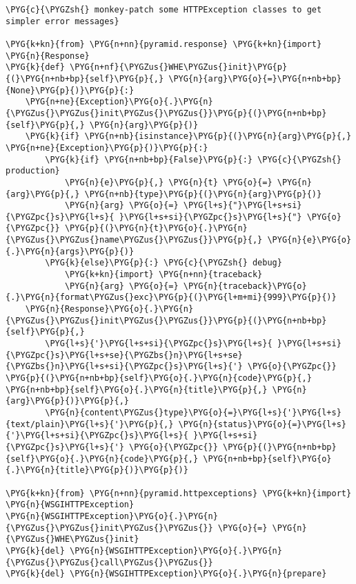 \begin{Verbatim}[commandchars=\\\{\}]
\PYG{c}{\PYGZsh{} monkey-patch some HTTPException classes to get simpler error messages}

\PYG{k+kn}{from} \PYG{n+nn}{pyramid.response} \PYG{k+kn}{import} \PYG{n}{Response}
\PYG{k}{def} \PYG{n+nf}{\PYGZus{}WHE\PYGZus{}init}\PYG{p}{(}\PYG{n+nb+bp}{self}\PYG{p}{,} \PYG{n}{arg}\PYG{o}{=}\PYG{n+nb+bp}{None}\PYG{p}{)}\PYG{p}{:}
    \PYG{n+ne}{Exception}\PYG{o}{.}\PYG{n}{\PYGZus{}\PYGZus{}init\PYGZus{}\PYGZus{}}\PYG{p}{(}\PYG{n+nb+bp}{self}\PYG{p}{,} \PYG{n}{arg}\PYG{p}{)}
    \PYG{k}{if} \PYG{n+nb}{isinstance}\PYG{p}{(}\PYG{n}{arg}\PYG{p}{,} \PYG{n+ne}{Exception}\PYG{p}{)}\PYG{p}{:}
        \PYG{k}{if} \PYG{n+nb+bp}{False}\PYG{p}{:} \PYG{c}{\PYGZsh{} production}
            \PYG{n}{e}\PYG{p}{,} \PYG{n}{t} \PYG{o}{=} \PYG{n}{arg}\PYG{p}{,} \PYG{n+nb}{type}\PYG{p}{(}\PYG{n}{arg}\PYG{p}{)}
            \PYG{n}{arg} \PYG{o}{=} \PYG{l+s}{"}\PYG{l+s+si}{\PYGZpc{}s}\PYG{l+s}{ }\PYG{l+s+si}{\PYGZpc{}s}\PYG{l+s}{"} \PYG{o}{\PYGZpc{}} \PYG{p}{(}\PYG{n}{t}\PYG{o}{.}\PYG{n}{\PYGZus{}\PYGZus{}name\PYGZus{}\PYGZus{}}\PYG{p}{,} \PYG{n}{e}\PYG{o}{.}\PYG{n}{args}\PYG{p}{)}
        \PYG{k}{else}\PYG{p}{:} \PYG{c}{\PYGZsh{} debug}
            \PYG{k+kn}{import} \PYG{n+nn}{traceback}
            \PYG{n}{arg} \PYG{o}{=} \PYG{n}{traceback}\PYG{o}{.}\PYG{n}{format\PYGZus{}exc}\PYG{p}{(}\PYG{l+m+mi}{999}\PYG{p}{)}
    \PYG{n}{Response}\PYG{o}{.}\PYG{n}{\PYGZus{}\PYGZus{}init\PYGZus{}\PYGZus{}}\PYG{p}{(}\PYG{n+nb+bp}{self}\PYG{p}{,}
        \PYG{l+s}{'}\PYG{l+s+si}{\PYGZpc{}s}\PYG{l+s}{ }\PYG{l+s+si}{\PYGZpc{}s}\PYG{l+s+se}{\PYGZbs{}n}\PYG{l+s+se}{\PYGZbs{}n}\PYG{l+s+si}{\PYGZpc{}s}\PYG{l+s}{'} \PYG{o}{\PYGZpc{}} \PYG{p}{(}\PYG{n+nb+bp}{self}\PYG{o}{.}\PYG{n}{code}\PYG{p}{,} \PYG{n+nb+bp}{self}\PYG{o}{.}\PYG{n}{title}\PYG{p}{,} \PYG{n}{arg}\PYG{p}{)}\PYG{p}{,}
        \PYG{n}{content\PYGZus{}type}\PYG{o}{=}\PYG{l+s}{'}\PYG{l+s}{text/plain}\PYG{l+s}{'}\PYG{p}{,} \PYG{n}{status}\PYG{o}{=}\PYG{l+s}{'}\PYG{l+s+si}{\PYGZpc{}s}\PYG{l+s}{ }\PYG{l+s+si}{\PYGZpc{}s}\PYG{l+s}{'} \PYG{o}{\PYGZpc{}} \PYG{p}{(}\PYG{n+nb+bp}{self}\PYG{o}{.}\PYG{n}{code}\PYG{p}{,} \PYG{n+nb+bp}{self}\PYG{o}{.}\PYG{n}{title}\PYG{p}{)}\PYG{p}{)}

\PYG{k+kn}{from} \PYG{n+nn}{pyramid.httpexceptions} \PYG{k+kn}{import} \PYG{n}{WSGIHTTPException}
\PYG{n}{WSGIHTTPException}\PYG{o}{.}\PYG{n}{\PYGZus{}\PYGZus{}init\PYGZus{}\PYGZus{}} \PYG{o}{=} \PYG{n}{\PYGZus{}WHE\PYGZus{}init}
\PYG{k}{del} \PYG{n}{WSGIHTTPException}\PYG{o}{.}\PYG{n}{\PYGZus{}\PYGZus{}call\PYGZus{}\PYGZus{}}
\PYG{k}{del} \PYG{n}{WSGIHTTPException}\PYG{o}{.}\PYG{n}{prepare}
\end{Verbatim}


